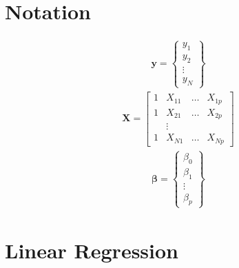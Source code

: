 \documentclass[11pt]{article}
\theoremstyle{remark}
\begin{document}
\section{Notation}
\begin{eqnarray}
\mathbf{y} =
\left\{
\begin{array}{c}
y_1\\
y_2\\
\vdots\\
y_N
\end{array}
\right\}
\end{eqnarray}
\begin{eqnarray}
\mathbf{X} =
\left[
\begin{array}{cccc}
1 & X_{11} & \hdots & X_{1p}\\
1 & X_{21} & \hdots & X_{2p}\\
  & \vdots &  & \\
1 & X_{N1} & \hdots & X_{Np}
\end{array}
\right]
\end{eqnarray}
\begin{eqnarray}
\boldsymbol{\beta} =
\left\{
\begin{array}{c}
\beta_0\\
\beta_1\\
\vdots\\
\beta_p
\end{array}
\right\}
\end{eqnarray}

\section{Linear Regression}
\end{document}
